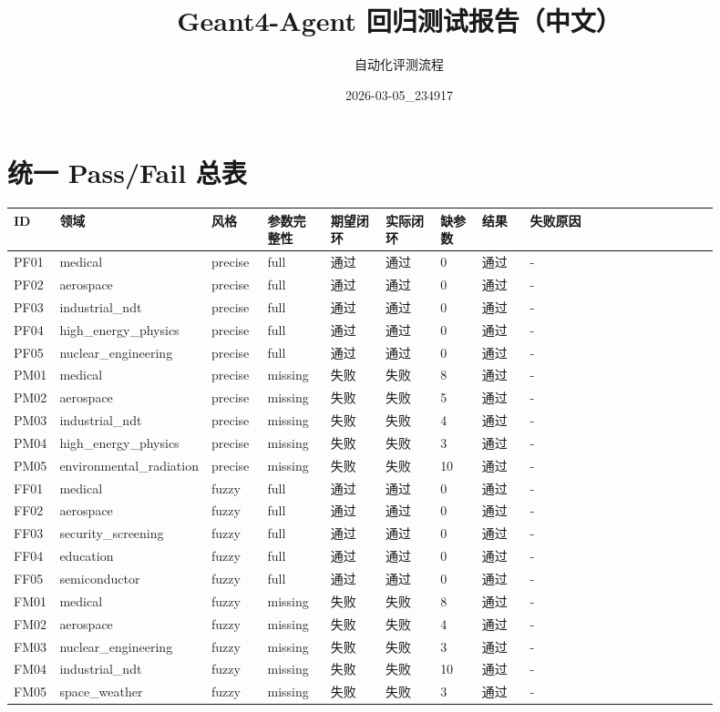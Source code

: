 \documentclass[11pt]{ctexart}
\title{Geant4-Agent 回归测试报告（中文）}
\author{自动化评测流程}
\date{2026-03-05\_234917}
\begin{document}
\maketitle
\section{统一 Pass/Fail 总表}
\begin{longtable}{p{0.06\linewidth}p{0.1\linewidth}p{0.08\linewidth}p{0.09\linewidth}p{0.08\linewidth}p{0.08\linewidth}p{0.06\linewidth}p{0.07\linewidth}p{0.28\linewidth}}
\toprule
ID & 领域 & 风格 & 参数完整性 & 期望闭环 & 实际闭环 & 缺参数 & 结果 & 失败原因 \\
\midrule
PF01 & medical & precise & full & 通过 & 通过 & 0 & 通过 & - \\
PF02 & aerospace & precise & full & 通过 & 通过 & 0 & 通过 & - \\
PF03 & industrial\_ndt & precise & full & 通过 & 通过 & 0 & 通过 & - \\
PF04 & high\_energy\_physics & precise & full & 通过 & 通过 & 0 & 通过 & - \\
PF05 & nuclear\_engineering & precise & full & 通过 & 通过 & 0 & 通过 & - \\
PM01 & medical & precise & missing & 失败 & 失败 & 8 & 通过 & - \\
PM02 & aerospace & precise & missing & 失败 & 失败 & 5 & 通过 & - \\
PM03 & industrial\_ndt & precise & missing & 失败 & 失败 & 4 & 通过 & - \\
PM04 & high\_energy\_physics & precise & missing & 失败 & 失败 & 3 & 通过 & - \\
PM05 & environmental\_radiation & precise & missing & 失败 & 失败 & 10 & 通过 & - \\
FF01 & medical & fuzzy & full & 通过 & 通过 & 0 & 通过 & - \\
FF02 & aerospace & fuzzy & full & 通过 & 通过 & 0 & 通过 & - \\
FF03 & security\_screening & fuzzy & full & 通过 & 通过 & 0 & 通过 & - \\
FF04 & education & fuzzy & full & 通过 & 通过 & 0 & 通过 & - \\
FF05 & semiconductor & fuzzy & full & 通过 & 通过 & 0 & 通过 & - \\
FM01 & medical & fuzzy & missing & 失败 & 失败 & 8 & 通过 & - \\
FM02 & aerospace & fuzzy & missing & 失败 & 失败 & 4 & 通过 & - \\
FM03 & nuclear\_engineering & fuzzy & missing & 失败 & 失败 & 3 & 通过 & - \\
FM04 & industrial\_ndt & fuzzy & missing & 失败 & 失败 & 10 & 通过 & - \\
FM05 & space\_weather & fuzzy & missing & 失败 & 失败 & 3 & 通过 & - \\
\bottomrule
\end{longtable}
\end{document}
